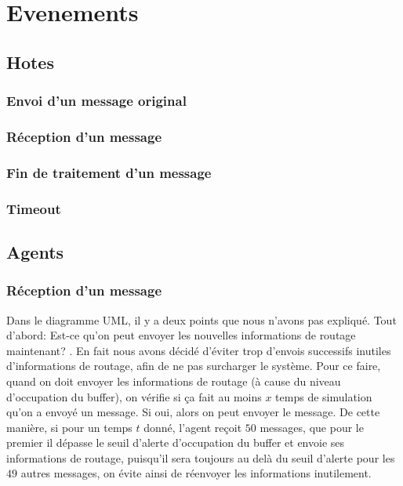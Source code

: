 \documentclass[a4paper,11pt]{article}
\begin{document}

\tableofcontents %
\pagebreak
\listoffigures %
\pagebreak


\section{Evenements}

\subsection{Hotes}
\subsubsection{Envoi d'un message original}
\subsubsection{Réception d'un message}
\subsubsection{Fin de traitement d'un message}
\subsubsection{Timeout}

\subsection{Agents}
\subsubsection{Réception d'un message}
Dans le diagramme UML, il y a deux points que nous n'avons pas expliqué. Tout d'abord: \og Est-ce qu'on peut envoyer les nouvelles informations de routage maintenant? \fg. En fait nous avons décidé d'éviter trop d'envois successifs inutiles d'informations de routage, afin de ne pas surcharger le système. Pour ce faire, quand on doit envoyer les informations de routage (à cause du niveau d'occupation du buffer), on vérifie si ça fait au moins $x$ temps de simulation qu'on a envoyé un message. Si oui, alors on peut envoyer le message. De cette manière, si pour un temps $t$ donné, l'agent reçoit $50$ messages, que pour le premier il dépasse le seuil d'alerte d'occupation du buffer et envoie ses informations de routage, puisqu'il sera toujours au delà du seuil d'alerte pour les $49$ autres messages, on évite ainsi de réenvoyer les informations inutilement.
\end{document}
